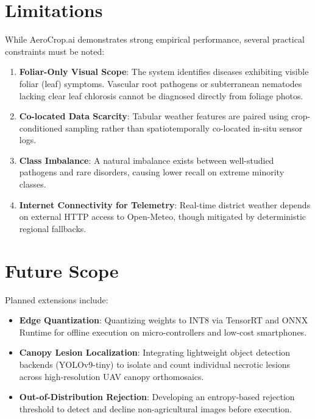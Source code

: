 \documentclass[conference]{IEEEtran}
\begin{document}
\section{Limitations}

While AeroCrop.ai demonstrates strong empirical performance, several practical constraints must be noted:
\begin{enumerate}
    \item \textbf{Foliar-Only Visual Scope}: The system identifies diseases exhibiting visible foliar (leaf) symptoms. Vascular root pathogens or subterranean nematodes lacking clear leaf chlorosis cannot be diagnosed directly from foliage photos.
    \item \textbf{Co-located Data Scarcity}: Tabular weather features are paired using crop-conditioned sampling rather than spatiotemporally co-located in-situ sensor logs.
    \item \textbf{Class Imbalance}: A natural imbalance exists between well-studied pathogens and rare disorders, causing lower recall on extreme minority classes.
    \item \textbf{Internet Connectivity for Telemetry}: Real-time district weather depends on external HTTP access to Open-Meteo, though mitigated by deterministic regional fallbacks.
\end{enumerate}

\section{Future Scope}

Planned extensions include:
\begin{itemize}
    \item \textbf{Edge Quantization}: Quantizing weights to INT8 via TensorRT and ONNX Runtime for offline execution on micro-controllers and low-cost smartphones.
    \item \textbf{Canopy Lesion Localization}: Integrating lightweight object detection backends (YOLOv9-tiny) to isolate and count individual necrotic lesions across high-resolution UAV canopy orthomosaics.
    \item \textbf{Out-of-Distribution Rejection}: Developing an entropy-based rejection threshold to detect and decline non-agricultural images before execution.
\end{itemize}
\end{document}
